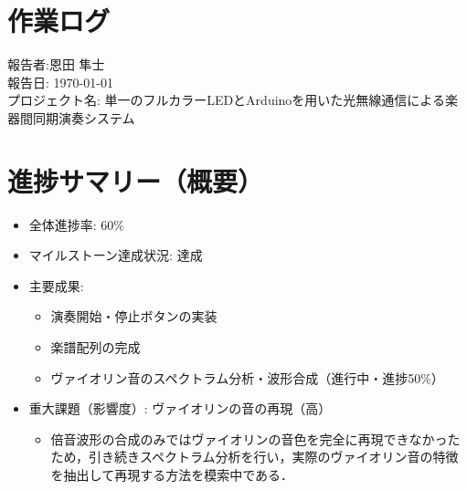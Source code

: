 \documentclass[lualatex,paper=a4paper,jafontsize=11.5pt,jafontscale=1.05]{jlreq}
\begin{document}
\section*{作業ログ}
\noindent
報告者:恩田 隼士\\
報告日: \today \\
プロジェクト名: 単一のフルカラーLEDとArduinoを用いた光無線通信による楽器間同期演奏システム \\
\hrulefill

\section{進捗サマリー（概要）}
\begin{itemize}
 \item 全体進捗率: 60\%
 \item マイルストーン達成状況: 達成
 \item 主要成果:
 \begin{itemize}
    \item 演奏開始・停止ボタンの実装
    \item 楽譜配列の完成
    \item ヴァイオリン音のスペクトラム分析・波形合成（進行中・進捗50\%）
 \end{itemize}
 \item 重大課題（影響度）: ヴァイオリンの音の再現（高）
 \begin{itemize}
    \item 倍音波形の合成のみではヴァイオリンの音色を完全に再現できなかったため，引き続きスペクトラム分析を行い，実際のヴァイオリン音の特徴を抽出して再現する方法を模索中である．
 \end{itemize}

\end{itemize}
\end{document}
